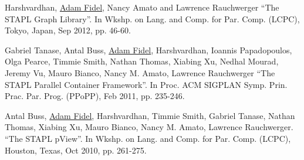 \documentclass[a4paper,10pt,oneside]{article}
\begin{document}
\begin{body}
\EntryGap

{Harshvardhan, \underline{Adam Fidel}, Nancy Amato and Lawrence Rauchwerger ``The STAPL Graph Library''. In Wkshp. on Lang. and Comp. for Par. Comp. (LCPC), Tokyo, Japan, Sep 2012, pp. 46-60.}

\EntryGap

{Gabriel Tanase, Antal Buss, \underline{Adam Fidel}, Harshvardhan, Ioannis Papadopoulos, Olga Pearce, Timmie Smith, Nathan Thomas, Xiabing Xu, Nedhal Mourad, Jeremy Vu, Mauro Bianco, Nancy M. Amato, Lawrence Rauchwerger ``The STAPL Parallel Container Framework''. In Proc. ACM SIGPLAN Symp. Prin. Prac. Par. Prog. (PPoPP), Feb 2011, pp. 235-246.}

\EntryGap

{Antal Buss, \underline{Adam Fidel}, Harshvardhan, Timmie Smith, Gabriel Tanase, Nathan Thomas, Xiabing Xu, Mauro Bianco, Nancy M. Amato, Lawrence Rauchwerger. ``The STAPL pView''. In Wkshp. on Lang. and Comp. for Par. Comp. (LCPC), Houston, Texas, Oct 2010, pp. 261-275.}


%
%
%
%
%
%
%
%
%
%


\end{body}
\end{document}
